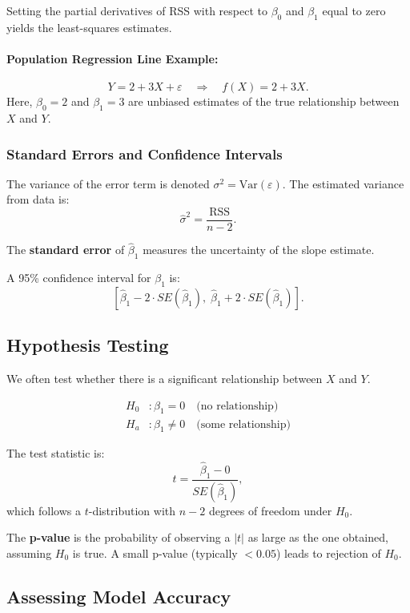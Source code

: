 Setting the partial derivatives of RSS with respect to \(\beta_0\) and \(\beta_1\) equal to zero yields the least-squares estimates.

\paragraph{Population Regression Line Example:}
\[
Y = 2 + 3X + \varepsilon \quad \Rightarrow \quad f(X) = 2 + 3X.
\]
Here, \(\beta_0 = 2\) and \(\beta_1 = 3\) are unbiased estimates of the true relationship between \(X\) and \(Y\).

\subsubsection{Standard Errors and Confidence Intervals}

The variance of the error term is denoted \(\sigma^2 = \text{Var}(\varepsilon)\).  
The estimated variance from data is:
\[
\widehat{\sigma}^2 = \frac{\text{RSS}}{n - 2}.
\]

The \textbf{standard error} of \(\hat{\beta}_1\) measures the uncertainty of the slope estimate.

A 95\% confidence interval for \(\beta_1\) is:
\[
[\hat{\beta}_1 - 2 \cdot SE(\hat{\beta}_1), \; \hat{\beta}_1 + 2 \cdot SE(\hat{\beta}_1)].
\]

\subsection{Hypothesis Testing}

We often test whether there is a significant relationship between \(X\) and \(Y\).

\[
\begin{aligned}
H_0 &: \beta_1 = 0 \quad \text{(no relationship)} \\
H_a &: \beta_1 \neq 0 \quad \text{(some relationship)}
\end{aligned}
\]

The test statistic is:
\[
t = \frac{\hat{\beta}_1 - 0}{SE(\hat{\beta}_1)},
\]
which follows a \(t\)-distribution with \(n - 2\) degrees of freedom under \(H_0\).

The \textbf{p-value} is the probability of observing a \( |t| \) as large as the one obtained, assuming \(H_0\) is true.  
A small p-value (typically \(< 0.05\)) leads to rejection of \(H_0\).

\subsection{Assessing Model Accuracy}

